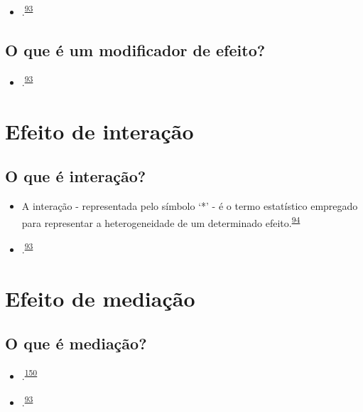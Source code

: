 \documentclass[
]{book}
\providecommand{\tightlist}{%
  \setlength{\itemsep}{0pt}\setlength{\parskip}{0pt}}
\begin{document}
\begin{itemize}
\tightlist
\item
  .\textsuperscript{\protect\hyperlink{ref-Bours2023}{93}}
\end{itemize}

\hypertarget{o-que-uxe9-um-modificador-de-efeito-1}{%
\subsection{O que é um modificador de efeito?}\label{o-que-uxe9-um-modificador-de-efeito-1}}

\begin{itemize}
\tightlist
\item
  .\textsuperscript{\protect\hyperlink{ref-Bours2023}{93}}
\end{itemize}

\hypertarget{interacao}{%
\section{Efeito de interação}\label{interacao}}

\hypertarget{o-que-uxe9-interauxe7uxe3o}{%
\subsection{O que é interação?}\label{o-que-uxe9-interauxe7uxe3o}}

\begin{itemize}
\item
  A interação - representada pelo símbolo `*' - é o termo estatístico empregado para representar a heterogeneidade de um determinado efeito.\textsuperscript{\protect\hyperlink{ref-Altman1996}{94}}
\item
  .\textsuperscript{\protect\hyperlink{ref-Bours2023}{93}}
\end{itemize}

\hypertarget{mediacao}{%
\section{Efeito de mediação}\label{mediacao}}

\hypertarget{o-que-uxe9-mediauxe7uxe3o}{%
\subsection{O que é mediação?}\label{o-que-uxe9-mediauxe7uxe3o}}

\begin{itemize}
\item
  .\textsuperscript{\protect\hyperlink{ref-Baron1986}{150}}
\item
  .\textsuperscript{\protect\hyperlink{ref-Bours2023}{93}}
\end{itemize}
\end{document}
